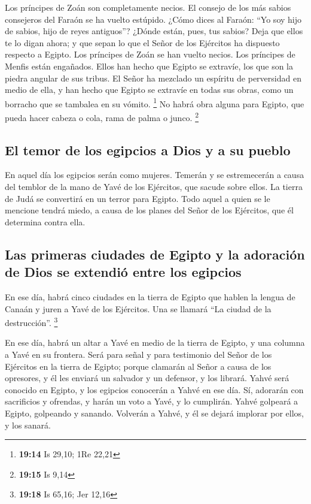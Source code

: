 \begin{paracol}{2}
 Los príncipes de Zoán son completamente necios. El
consejo de los más sabios consejeros del Faraón se ha vuelto estúpido.
¿Cómo dices al Faraón: ``Yo soy hijo de sabios, hijo de reyes
antiguos''?  ¿Dónde están, pues, tus sabios? Deja que
ellos te lo digan ahora; y que sepan lo que el Señor de los Ejércitos ha
dispuesto respecto a Egipto.  Los príncipes de Zoán se
han vuelto necios. Los príncipes de Menfis están engañados. Ellos han
hecho que Egipto se extravíe, los que son la piedra angular de sus
tribus.  El Señor ha mezclado un espíritu de perversidad
en medio de ella, y han hecho que Egipto se extravíe en todas sus obras,
como un borracho que se tambalea en su vómito. \footnote{\textbf{19:14}
  Is 29,10; 1Re 22,21}  No habrá obra alguna para Egipto,
que pueda hacer cabeza o cola, rama de palma o junco. \footnote{\textbf{19:15}
  Is 9,14}

\hypertarget{el-temor-de-los-egipcios-a-dios-y-a-su-pueblo}{%
\subsection{El temor de los egipcios a Dios y a su
pueblo}\label{el-temor-de-los-egipcios-a-dios-y-a-su-pueblo}}

 En aquel día los egipcios serán como mujeres. Temerán y
se estremecerán a causa del temblor de la mano de Yavé de los Ejércitos,
que sacude sobre ellos.  La tierra de Judá se convertirá
en un terror para Egipto. Todo aquel a quien se le mencione tendrá
miedo, a causa de los planes del Señor de los Ejércitos, que él
determina contra ella.

\hypertarget{las-primeras-ciudades-de-egipto-y-la-adoraciuxf3n-de-dios-se-extendiuxf3-entre-los-egipcios}{%
\subsection{Las primeras ciudades de Egipto y la adoración de Dios se
extendió entre los
egipcios}\label{las-primeras-ciudades-de-egipto-y-la-adoraciuxf3n-de-dios-se-extendiuxf3-entre-los-egipcios}}

 En ese día, habrá cinco ciudades en la tierra de Egipto
que hablen la lengua de Canaán y juren a Yavé de los Ejércitos. Una se
llamará ``La ciudad de la destrucción''. \footnote{\textbf{19:18} Is
  65,16; Jer 12,16}

 En ese día, habrá un altar a Yavé en medio de la tierra
de Egipto, y una columna a Yavé en su frontera.  Será
para señal y para testimonio del Señor de los Ejércitos en la tierra de
Egipto; porque clamarán al Señor a causa de los opresores, y él les
enviará un salvador y un defensor, y los librará.  Yahvé
será conocido en Egipto, y los egipcios conocerán a Yahvé en ese día.
Sí, adorarán con sacrificios y ofrendas, y harán un voto a Yavé, y lo
cumplirán.  Yahvé golpeará a Egipto, golpeando y sanando.
Volverán a Yahvé, y él se dejará implorar por ellos, y los sanará.


\end{paracol}
